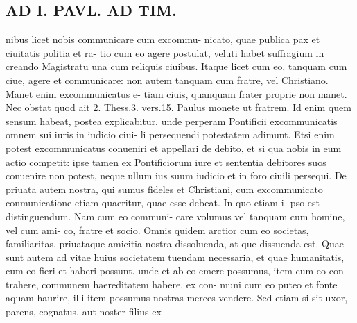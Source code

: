 \documentclass{article}
\begin{document}
\begin{pages}
\section*{AD I. PAVL. AD TIM. }
\marginpar{[ p.404 ]}nibus licet nobis communicare cum excommu- nicato, quae publica pax et ciuitatis politia et ra- tio cum eo agere postulat, veluti habet suffragium in creando Magistratu una cum reliquis ciuibus. Itaque licet cum eo, tanquam cum ciue, agere et communicare: non autem tanquam cum fratre, vel Christiano. Manet enim excommunicatus e- tiam ciuis, quanquam frater proprie non manet. Nec obstat quod ait 2. Thess.3. vers.15. Paulus monete ut fratrem. Id enim quem sensum habeat, postea explicabitur. unde perperam Pontificii excommunicatis omnem sui iuris in iudicio ciui- li persequendi potestatem adimunt. Etsi enim potest excommunicatus conueniri et appellari de debito, et si qua nobis in eum actio competit: ipse tamen ex Pontificiorum iure et sententia debitores suos conuenire non potest, neque ullum ius suum iudicio et in foro ciuili persequi. De priuata autem nostra, qui sumus fideles et Christiani, cum excommunicato conmunicatione etiam quaeritur, quae esse debeat. In quo etiam i- pso est distinguendum. Nam cum eo communi- care volumus vel tanquam cum homine, vel cum ami- co, fratre et socio. Omnis quidem arctior cum eo societas, familiaritas, priuataque amicitia nostra dissoluenda, at que dissuenda est. Quae sunt autem ad vitae huius societatem tuendam necessaria, et quae humanitatis, cum eo fieri et haberi possunt. unde et ab eo emere possumus, item cum eo con- trahere, communem haereditatem habere, ex con- muni cum eo puteo et fonte aquam haurire, illi item possumus nostras merces vendere. Sed etiam si sit uxor, parens, cognatus, aut noster filius ex- 

\end{pages}
\end{document}
